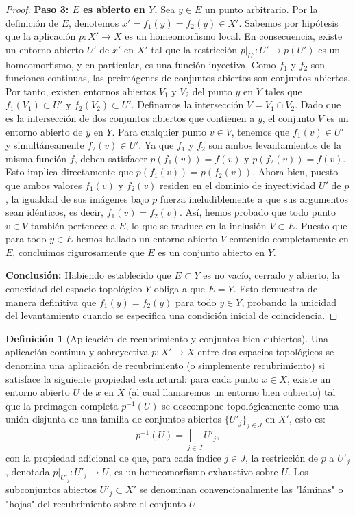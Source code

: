 \documentclass[11pt,a4paper]{article}
\theoremstyle{definition}
\newtheorem{definicion}{Definición}[section]
\theoremstyle{remark}
\numberwithin{equation}{section}
\begin{document}
\begin{proof}
\textbf{Paso 3: $E$ es abierto en $Y$.}
Sea $y \in E$ un punto arbitrario. Por la definición de $E$, denotemos $x' = f_1(y) = f_2(y) \in X'$. Sabemos por hipótesis que la aplicación $p: X' \to X$ es un homeomorfismo local. En consecuencia, existe un entorno abierto $U'$ de $x'$ en $X'$ tal que la restricción $p|_{U'}: U' \to p(U')$ es un homeomorfismo, y en particular, es una función inyectiva. 
Como $f_1$ y $f_2$ son funciones continuas, las preimágenes de conjuntos abiertos son conjuntos abiertos. Por tanto, existen entornos abiertos $V_1$ y $V_2$ del punto $y$ en $Y$ tales que $f_1(V_1) \subset U'$ y $f_2(V_2) \subset U'$. Definamos la intersección $V = V_1 \cap V_2$. Dado que es la intersección de dos conjuntos abiertos que contienen a $y$, el conjunto $V$ es un entorno abierto de $y$ en $Y$.
Para cualquier punto $v \in V$, tenemos que $f_1(v) \in U'$ y simultáneamente $f_2(v) \in U'$. Ya que $f_1$ y $f_2$ son ambos levantamientos de la misma función $f$, deben satisfacer $p(f_1(v)) = f(v)$ y $p(f_2(v)) = f(v)$. Esto implica directamente que $p(f_1(v)) = p(f_2(v))$. 
Ahora bien, puesto que ambos valores $f_1(v)$ y $f_2(v)$ residen en el dominio de inyectividad $U'$ de $p$, la igualdad de sus imágenes bajo $p$ fuerza ineludiblemente a que sus argumentos sean idénticos, es decir, $f_1(v) = f_2(v)$. Así, hemos probado que todo punto $v \in V$ también pertenece a $E$, lo que se traduce en la inclusión $V \subset E$. Puesto que para todo $y \in E$ hemos hallado un entorno abierto $V$ contenido completamente en $E$, concluimos rigurosamente que $E$ es un conjunto abierto en $Y$.

\textbf{Conclusión:}
Habiendo establecido que $E \subset Y$ es no vacío, cerrado y abierto, la conexidad del espacio topológico $Y$ obliga a que $E = Y$. Esto demuestra de manera definitiva que $f_1(y) = f_2(y)$ para todo $y \in Y$, probando la unicidad del levantamiento cuando se especifica una condición inicial de coincidencia.
\end{proof}

\begin{definicion}[Aplicación de recubrimiento y conjuntos bien cubiertos]
Una aplicación continua y sobreyectiva $p: X' \to X$ entre dos espacios topológicos se denomina una aplicación de recubrimiento (o simplemente recubrimiento) si satisface la siguiente propiedad estructural: para cada punto $x \in X$, existe un entorno abierto $U$ de $x$ en $X$ (al cual llamaremos un entorno bien cubierto) tal que la preimagen completa $p^{-1}(U)$ se descompone topológicamente como una unión disjunta de una familia de conjuntos abiertos $\{U'_j\}_{j \in J}$ en $X'$, esto es:
\begin{equation}
p^{-1}(U) = \bigsqcup_{j \in J} U'_j,
\end{equation}
con la propiedad adicional de que, para cada índice $j \in J$, la restricción de $p$ a $U'_j$, denotada $p|_{U'_j} : U'_j \to U$, es un homeomorfismo exhaustivo sobre $U$. Los subconjuntos abiertos $U'_j \subset X'$ se denominan convencionalmente las "láminas" o "hojas" del recubrimiento sobre el conjunto $U$.
\end{definicion}
\end{document}
